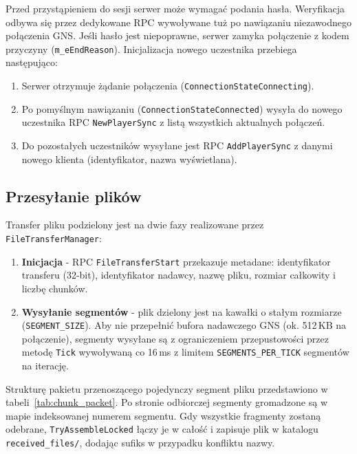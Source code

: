 Przed przystąpieniem do sesji serwer może wymagać podania hasła.
Weryfikacja odbywa się przez dedykowane RPC wywoływane tuż po
nawiązaniu niezawodnego połączenia GNS. Jeśli hasło jest niepoprawne,
serwer zamyka połączenie z kodem przyczyny (\texttt{m\_eEndReason}).
Inicjalizacja nowego uczestnika przebiega następująco:

\begin{enumerate}
    \item Serwer otrzymuje żądanie połączenia
    (\texttt{ConnectionStateConnecting}).
    \item Po pomyślnym nawiązaniu
    (\texttt{ConnectionStateConnected}) wysyła do nowego uczestnika
    RPC \texttt{NewPlayerSync} z listą wszystkich aktualnych połączeń.
    \item Do pozostałych uczestników wysyłane jest RPC
    \texttt{AddPlayerSync} z danymi nowego klienta (identyfikator,
    nazwa wyświetlana).
\end{enumerate}

\subsection*{Przesyłanie plików}

Transfer pliku podzielony jest na dwie fazy realizowane przez
\texttt{FileTransferManager}:

\begin{enumerate}
    \item \textbf{Inicjacja} - RPC \texttt{FileTransferStart} przekazuje
    metadane: identyfikator transferu (32-bit), identyfikator nadawcy,
    nazwę pliku, rozmiar całkowity i liczbę chunków.

    \item \textbf{Wysyłanie segmentów} - plik dzielony jest na kawałki
    o stałym rozmiarze (\texttt{SEGMENT\_SIZE}). Aby nie przepełnić
    bufora nadawczego GNS (ok. 512\,KB na połączenie), segmenty wysyłane
    są z ograniczeniem przepustowości przez metodę \texttt{Tick}
    wywoływaną co 16\,ms z limitem \texttt{SEGMENTS\_PER\_TICK} segmentów
    na iterację.
\end{enumerate}

Strukturę pakietu przenoszącego pojedynczy segment pliku przedstawiono
w tabeli~\ref{tab:chunk_packet}. Po stronie odbiorczej segmenty gromadzone są w mapie indeksowanej
numerem segmentu. Gdy wszystkie fragmenty zostaną odebrane,
\texttt{TryAssembleLocked} łączy je w całość i zapisuje plik
w katalogu \texttt{received\_files/}, dodając sufiks w przypadku
konfliktu nazwy.

